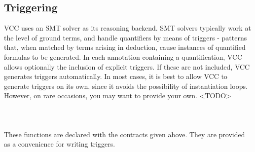 \documentclass[preprint,nocopyrightspace]{sigplanconf}
\begin{document}
{{{%


\subsection{Triggering}
VCC uses an SMT solver as its reasoning backend. SMT solvers typically
work at the level of ground terms, and handle quantifiers by means of
triggers - patterns that, when matched by terms arising in deduction,
cause instances of quantified formulas to be generated. In each
annotation containing a quantification, VCC allows optionally the
inclusion of explicit triggers. If these are not included, VCC
generates triggers automatically. In most cases, it is best to allow
VCC to generate triggers on its own, since it avoids the possibility
of instantiation loops. However, on rare occasions, you may want to
provide your own. <TODO>
\\\\
\\
\\
These functions are declared with the contracts given above. They are provided as a
convenience for writing triggers. 

}}}
\end{document}
